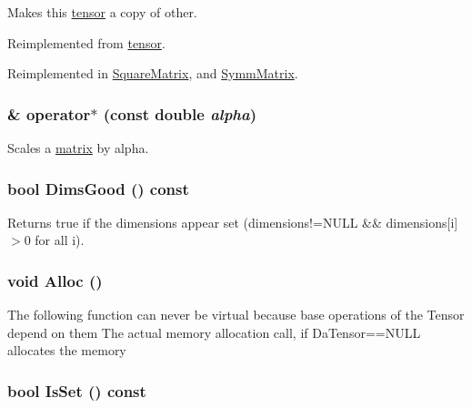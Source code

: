 Makes this \hyperlink{classJKBuilder_1_1tensor}{tensor} a copy of other. 

Reimplemented from \hyperlink{classJKBuilder_1_1tensor_a29113cbfe726b02b94576f631c983386}{tensor}.

Reimplemented in \hyperlink{classJKBuilder_1_1SquareMatrix_ad78e5a12d26f1984d77a57095bc4d181}{SquareMatrix}, and \hyperlink{classJKBuilder_1_1SymmMatrix_aca4a8297278ff39c5422febf1dcbc5ac}{SymmMatrix}.\hypertarget{classJKBuilder_1_1matrix_ad4799cbe4a5d07c77f41857a3ce914a2}{
\subsubsection[{operator$\ast$}]{ \& operator$\ast$ (const double {\em alpha})}}
\label{classJKBuilder_1_1matrix_ad4799cbe4a5d07c77f41857a3ce914a2}


Scales a \hyperlink{classJKBuilder_1_1matrix}{matrix} by alpha. \hypertarget{classJKBuilder_1_1tensor_a6e72344440b411f433eb50171648c2d0}{
\subsubsection[{DimsGood}]{\setlength{\rightskip}{0pt plus 5cm}bool DimsGood () const}}
\label{classJKBuilder_1_1tensor_a6e72344440b411f433eb50171648c2d0}


Returns true if the dimensions appear set (dimensions!=NULL \&\& dimensions\mbox{[}i\mbox{]}$>$0 for all i). \hypertarget{classJKBuilder_1_1tensor_a0ca5cbe96d2a61f06ae4b543ef84f166}{
\subsubsection[{Alloc}]{\setlength{\rightskip}{0pt plus 5cm}void Alloc ()}}
\label{classJKBuilder_1_1tensor_a0ca5cbe96d2a61f06ae4b543ef84f166}
The following function can never be virtual because base operations of the Tensor depend on them The actual memory allocation call, if DaTensor==NULL allocates the memory \hypertarget{classJKBuilder_1_1tensor_a79c9a36acc5dbeab94033ca97971dc09}{
\subsubsection[{IsSet}]{\setlength{\rightskip}{0pt plus 5cm}bool IsSet () const}}
\label{classJKBuilder_1_1tensor_a79c9a36acc5dbeab94033ca97971dc09}


